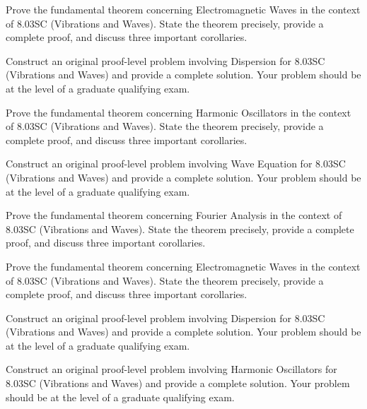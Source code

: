 \documentclass[12pt,a4paper]{exam}
\begin{document}
\begin{questions}
\vspace{0.3cm}

\question[5]
Prove the fundamental theorem concerning Electromagnetic Waves in the context of 8.03SC (Vibrations and Waves). State the theorem precisely, provide a complete proof, and discuss three important corollaries.

\vspace{0.3cm}

\question[7]
Construct an original proof-level problem involving Dispersion for 8.03SC (Vibrations and Waves) and provide a complete solution. Your problem should be at the level of a graduate qualifying exam.

\vspace{0.3cm}

\question[3]
Prove the fundamental theorem concerning Harmonic Oscillators in the context of 8.03SC (Vibrations and Waves). State the theorem precisely, provide a complete proof, and discuss three important corollaries.

\vspace{0.3cm}

\question[2]
Construct an original proof-level problem involving Wave Equation for 8.03SC (Vibrations and Waves) and provide a complete solution. Your problem should be at the level of a graduate qualifying exam.

\vspace{0.3cm}

\question[3]
Prove the fundamental theorem concerning Fourier Analysis in the context of 8.03SC (Vibrations and Waves). State the theorem precisely, provide a complete proof, and discuss three important corollaries.

\vspace{0.3cm}

\question[5]
Prove the fundamental theorem concerning Electromagnetic Waves in the context of 8.03SC (Vibrations and Waves). State the theorem precisely, provide a complete proof, and discuss three important corollaries.

\vspace{0.3cm}

\question[4]
Construct an original proof-level problem involving Dispersion for 8.03SC (Vibrations and Waves) and provide a complete solution. Your problem should be at the level of a graduate qualifying exam.

\vspace{0.3cm}

\question[2]
Construct an original proof-level problem involving Harmonic Oscillators for 8.03SC (Vibrations and Waves) and provide a complete solution. Your problem should be at the level of a graduate qualifying exam.


\end{questions}
\end{document}
